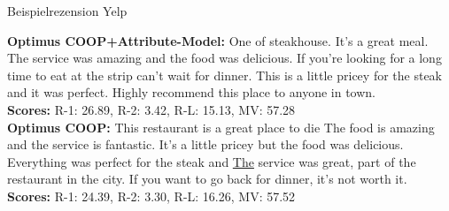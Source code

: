 \begin{frame}{Beispielrezension Yelp}
\begin{Rezension}[!h]
{{        \textbf{Optimus COOP+Attribute-Model:} One of \underline{\ccolorbox[BackgroundColor]{ \textcolor{HighlightColor}{the best}}} steakhouse\textcolor{HighlightColor}{.} It's a great meal\textcolor{HighlightColor}{.} \textcolor{HighlightColor}{The} service was \textcolor{HighlightColor}{amazing} and \textcolor{HighlightColor}{the} food was \textcolor{HighlightColor}{delicious}\textcolor{HighlightColor}{.} If \textcolor{HighlightColor}{you}'re looking \textcolor{HighlightColor}{for} a long time to eat at \textcolor{HighlightColor}{the} strip\ccolorbox[BackgroundColor]{\textcolor{HighlightColor}{. You}} ca\textcolor{HighlightColor}{n't} wait \textcolor{HighlightColor}{for} dinner\textcolor{HighlightColor}{.} \textcolor{HighlightColor}{This} \textcolor{HighlightColor}{is} a little pricey \textcolor{HighlightColor}{for} \textcolor{HighlightColor}{the} steak and it was perfect\textcolor{HighlightColor}{.} Highly recommend this \textcolor{HighlightColor}{place} to anyone in town\textcolor{HighlightColor}{.}         \\ 
        \textbf{Scores:} R-1: 26.89, R-2: 3.42, R-L: 15.13, MV: 57.28 \\ 
        \textbf{Optimus COOP:} \textcolor{HighlightColor}{This} restaurant \textcolor{HighlightColor}{is} a great \textcolor{HighlightColor}{place} to die \ccolorbox[BackgroundColor]{ \textcolor{HighlightColor}{for.}} \textcolor{HighlightColor}{The} food \textcolor{HighlightColor}{is} \textcolor{HighlightColor}{amazing} and \textcolor{HighlightColor}{the} service \textcolor{HighlightColor}{is} fantastic\textcolor{HighlightColor}{.} It's a little pricey but \textcolor{HighlightColor}{the} food was \textcolor{HighlightColor}{delicious}\textcolor{HighlightColor}{.} Everything was perfect \textcolor{HighlightColor}{for} \textcolor{HighlightColor}{the} steak and \underline{\ccolorbox[BackgroundColor]{ \textcolor{HighlightColor}{delicious!}} \textcolor{HighlightColor}{The}} service was great\textcolor{HighlightColor}{,} \ccolorbox[BackgroundColor]{ \textcolor{HighlightColor}{the best}} part of \textcolor{HighlightColor}{the} restaurant in \textcolor{HighlightColor}{the} city\textcolor{HighlightColor}{.} If \textcolor{HighlightColor}{you} want to go back \textcolor{HighlightColor}{for} dinner\textcolor{HighlightColor}{,} it's not worth it\textcolor{HighlightColor}{.}         \\ 
        \textbf{Scores:} R-1: 24.39, R-2: 3.30, R-L: 16.26, MV: 57.52  

        }
    }
\end{Rezension}
\end{frame}

